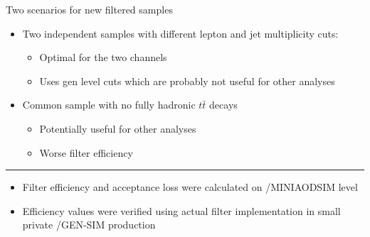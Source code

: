 \documentclass[xcolor=table]{beamer}
\begin{document}
\begin{frame}{Two scenarios for new filtered samples}
\begin{itemize}
\item Two independent samples with different lepton and jet multiplicity cuts:
\begin{itemize}
\item Optimal for the two channels
\item Uses gen level cuts which are probably not useful for other analyses
\end{itemize}
\vspace{10pt}
\item Common sample with no fully hadronic $t\bar{t}$ decays
\begin{itemize}
\item Potentially useful for other analyses
\item Worse filter efficiency
\end{itemize}
\end{itemize}
\vspace{25pt}
\hrule
\begin{itemize}
\item Filter efficiency and acceptance loss were calculated on /MINIAODSIM level
\item Efficiency values were verified using actual filter implementation in small private /GEN-SIM production 
\end{itemize}
\end{frame}
\end{document}
